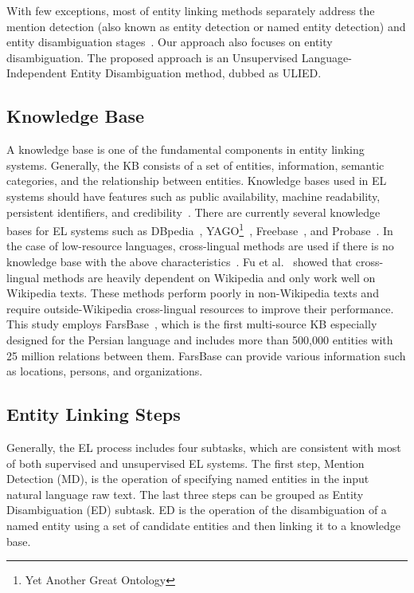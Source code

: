 \documentclass{article}
\begin{document}
With few exceptions, most of entity linking methods separately address the mention detection (also known as entity detection or named entity detection) and entity disambiguation stages~\cite{kolitsas2018end}. Our approach also focuses on entity disambiguation. The proposed approach is an Unsupervised Language-Independent Entity Disambiguation method, dubbed as ULIED.

\subsection{Knowledge Base}
A knowledge base is one of the fundamental components in entity linking systems. Generally, the KB consists of a set of entities, information, semantic categories, and the relationship between entities. Knowledge bases used in EL systems should have features such as public availability, machine readability, persistent identifiers, and credibility~\cite{taufer2017named}. There are currently several knowledge bases for EL systems such as DBpedia~\cite{auer2007dbpedia}, YAGO\footnote{Yet Another Great Ontology }~\cite{suchanek2007yago}, Freebase~\cite{bollacker2008freebase}, and Probase~\cite{wu2012probase}. In the case of low-resource languages, cross-lingual methods are used if there is no knowledge base with the above characteristics~\cite{zhou2020improving}.
Fu et al.~\cite{fu2020design} showed that cross-lingual methods are heavily dependent on Wikipedia and only work well on Wikipedia texts. These methods perform poorly in non-Wikipedia texts and require outside-Wikipedia cross-lingual resources to improve their performance. This study employs FarsBase~\cite{asgari2019farsbase}, which is the first multi-source KB especially designed for the Persian language and includes more than 500,000 entities with 25 million relations between them. FarsBase can provide various information such as locations, persons, and organizations.

\subsection{Entity Linking Steps}
Generally, the EL process includes four subtasks, which are consistent with most of both supervised and unsupervised EL systems. The first step, Mention Detection (MD), is the operation of specifying named entities in the input natural language raw text. The last three steps can be grouped as Entity Disambiguation (ED) subtask. ED is the operation of the disambiguation of a named entity using a set of candidate entities and then linking it to a knowledge base.
\end{document}
